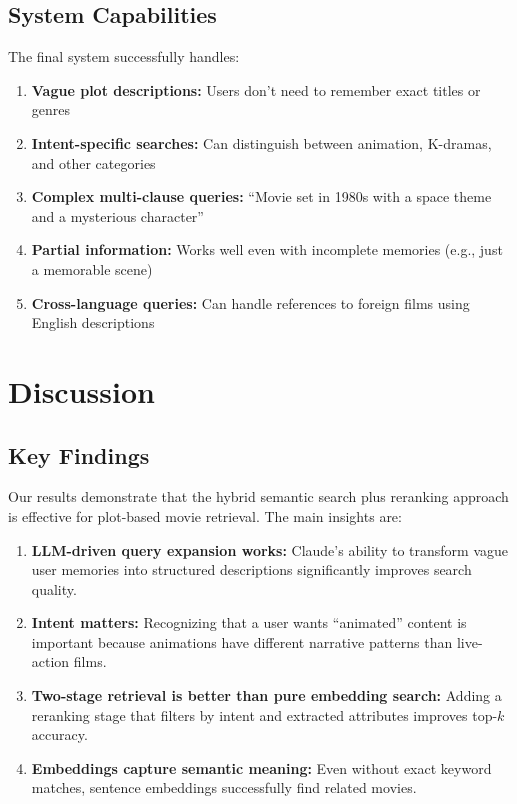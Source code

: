 \documentclass[11pt,a4paper]{article}
\begin{document}
\subsection{System Capabilities}

The final system successfully handles:

\begin{enumerate}
    \item \textbf{Vague plot descriptions:} Users don't need to remember exact titles or genres
    \item \textbf{Intent-specific searches:} Can distinguish between animation, K-dramas, and other categories
    \item \textbf{Complex multi-clause queries:} ``Movie set in 1980s with a space theme and a mysterious character''
    \item \textbf{Partial information:} Works well even with incomplete memories (e.g., just a memorable scene)
    \item \textbf{Cross-language queries:} Can handle references to foreign films using English descriptions
\end{enumerate}

\section{Discussion}

\subsection{Key Findings}

Our results demonstrate that the hybrid semantic search plus reranking approach is effective for plot-based movie retrieval. The main insights are:

\begin{enumerate}
    \item \textbf{LLM-driven query expansion works:} Claude's ability to transform vague user memories into structured descriptions significantly improves search quality.
    \item \textbf{Intent matters:} Recognizing that a user wants ``animated'' content is important because animations have different narrative patterns than live-action films.
    \item \textbf{Two-stage retrieval is better than pure embedding search:} Adding a reranking stage that filters by intent and extracted attributes improves top-$k$ accuracy.
    \item \textbf{Embeddings capture semantic meaning:} Even without exact keyword matches, sentence embeddings successfully find related movies.
\end{enumerate}
\end{document}
